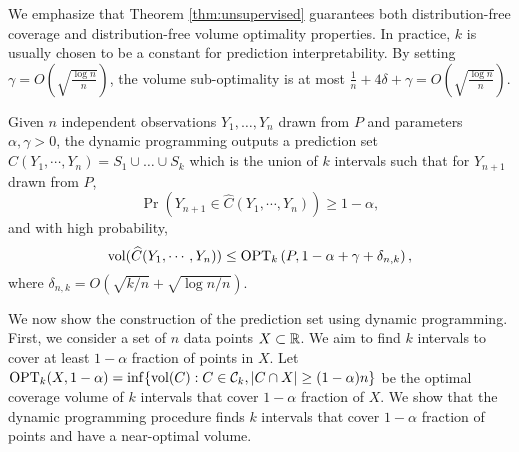 We emphasize that Theorem \ref{thm:unsupervised} guarantees both distribution-free coverage and distribution-free volume optimality properties. In practice, $k$ is usually chosen to be a constant for prediction interpretability. By setting $\gamma=O\left(\sqrt{\frac{\log n}{n}}\right)$, the volume sub-optimality is at most $\frac{1}{n}+4\delta+\gamma=O\left(\sqrt{\frac{\log n}{n}}\right)$.


\iffalse
\begin{remark}
A careful reader may notice that the restricted volume optimality is established with high probability. It will be also interesting to obtain a bound for the expected volume $\mathbb{E}\vol(\widehat{C}_{\rm CP-DP})$. In fact, a careful scrutiny of the proof leads to the tail bound
$$\mathbb{P}\left(\vol(\widehat{C}_{\rm CP-DP})> \opt_k\left(P,1-\alpha+\gamma+O\left(\sqrt{\frac{k+t}{n}}\right)\right)\right)\leq 2e^{-t},$$
for all $t>0$. Then, expected volume can be bounded by integrating out the tail probability
$$\mathbb{E}\vol(\widehat{C}_{\rm CP-DP})=\int_0^{\infty}\mathbb{P}\left(\vol(\widehat{C}_{\rm CP-DP})>x\right)dx.$$
Under some weak regularity assumption on $P$, the above integral will lead to $(1+\epsilon')\opt_k(P,1-\alpha+\epsilon)$ for some $\epsilon,\epsilon'>0$, which then can further be bounded by $\opt_k(P,1-\alpha+\epsilon'')$ for some $\epsilon''$. Such a strategy certainly covers distribution classes such as Gaussian mixtures, but in general it should be done case by case.
\end{remark}
\fi

\iffalse
\begin{theorem}\label{thm:unsupervised}
    Given $n$ independent observations $Y_1, \dots, Y_n$ drawn from $P$ and parameters $\alpha, \gamma > 0$, the dynamic programming outputs a prediction set $\widehat{C}(Y_1,\cdots,Y_n) = S_1 \cup \dots \cup S_k$ which is the union of $k$ intervals such that for $Y_{n+1}$ drawn from $P$,
    $$\Pr(Y_{n+1}\in \widehat{C}(Y_1,\cdots,Y_n))\geq 1-\alpha,$$
    and with high probability,
    $$\mathrm{vol}(\widehat{C}(Y_1,\cdots,Y_n))\leq \operatorname{OPT}_k\left(P,1-\alpha+\gamma+\delta_{n,k}\right),$$
    where $\delta_{n,k} = O(\sqrt{k/n} + \sqrt{\log n/n})$.
\end{theorem}

We now show the construction of the prediction set using dynamic programming. First, we consider a set of $n$ data points $X \subset \mathbb{R}$. We aim to find $k$ intervals to cover at least $1-\alpha$ fraction of points in $X$. 
Let $\operatorname{OPT}_k(X, 1-\alpha) = \inf \{\mathrm{vol}(C): C \in \mathcal{C}_k, |C \cap X| \geq (1-\alpha)n \}$ be the optimal coverage volume of $k$ intervals that cover $1-\alpha$ fraction of $X$. We show that the dynamic programming procedure finds $k$ intervals that cover $1-\alpha$ fraction of points and have a near-optimal volume. 



